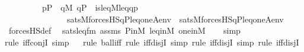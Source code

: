 \begin{isabellebody}
\ \ \ \ \ \ \ \ \ {\isacharparenleft}{\kern0pt}p{\isasymin}P\ {\isasymand}\ {\isasymnot}{\isacharparenleft}{\kern0pt}{\isasymexists}q{\isasymin}M{\isachardot}{\kern0pt}\ q{\isasymin}P\ {\isasymand}\ is{\isacharunderscore}{\kern0pt}leq{\isacharparenleft}{\kern0pt}{\isacharhash}{\kern0pt}{\isacharhash}{\kern0pt}M{\isacharcomma}{\kern0pt}leq{\isacharcomma}{\kern0pt}q{\isacharcomma}{\kern0pt}p{\isacharparenright}{\kern0pt}\ {\isasymand}\isanewline
\ \ \ \ \ \ \ \ \ \ \ \ \ \ \ {\isacharparenleft}{\kern0pt}sats{\isacharparenleft}{\kern0pt}M{\isacharcomma}{\kern0pt}forcesHS{\isacharprime}{\kern0pt}{\isacharparenleft}{\kern0pt}{\isasymphi}{\isacharparenright}{\kern0pt}{\isacharcomma}{\kern0pt}{\isacharbrackleft}{\kern0pt}q{\isacharcomma}{\kern0pt}P{\isacharcomma}{\kern0pt}leq{\isacharcomma}{\kern0pt}one{\isacharcomma}{\kern0pt}A{\isacharbrackright}{\kern0pt}{\isacharat}{\kern0pt}env{\isacharparenright}{\kern0pt}\ {\isasymand}\ sats{\isacharparenleft}{\kern0pt}M{\isacharcomma}{\kern0pt}forcesHS{\isacharprime}{\kern0pt}{\isacharparenleft}{\kern0pt}{\isasympsi}{\isacharparenright}{\kern0pt}{\isacharcomma}{\kern0pt}{\isacharbrackleft}{\kern0pt}q{\isacharcomma}{\kern0pt}P{\isacharcomma}{\kern0pt}leq{\isacharcomma}{\kern0pt}one{\isacharcomma}{\kern0pt}A{\isacharbrackright}{\kern0pt}{\isacharat}{\kern0pt}env{\isacharparenright}{\kern0pt}{\isacharparenright}{\kern0pt}{\isacharparenright}{\kern0pt}{\isacharparenright}{\kern0pt}{\isachardoublequoteclose}\isanewline
%
\isadelimproof
\ \ %
\endisadelimproof
%
\isatagproof
{}\isamarkupfalse%
\ forcesHS{\isacharunderscore}{\kern0pt}def\ \isamarkupfalse%
\ sats{\isacharunderscore}{\kern0pt}leq{\isacharunderscore}{\kern0pt}fm\ assms\ P{\isacharunderscore}{\kern0pt}in{\isacharunderscore}{\kern0pt}M\ leq{\isacharunderscore}{\kern0pt}in{\isacharunderscore}{\kern0pt}M\ one{\isacharunderscore}{\kern0pt}in{\isacharunderscore}{\kern0pt}M\isanewline
\ \ \isamarkupfalse%
\ simp\ \isanewline
\ \ \isamarkupfalse%
{\isacharparenleft}{\kern0pt}rule\ iff{\isacharunderscore}{\kern0pt}conjI{}{\isacharcomma}{\kern0pt}\ simp{\isacharparenright}{\kern0pt}\isanewline
\ \ \isamarkupfalse%
{\isacharparenleft}{\kern0pt}rule\ ball{\isacharunderscore}{\kern0pt}iff{\isacharcomma}{\kern0pt}\ rule\ iff{\isacharunderscore}{\kern0pt}disjI{\isacharcomma}{\kern0pt}\ simp{\isacharcomma}{\kern0pt}\ rule\ iff{\isacharunderscore}{\kern0pt}disjI{\isacharcomma}{\kern0pt}\ simp{\isacharcomma}{\kern0pt}\ rule\ iff{\isacharunderscore}{\kern0pt}disjI{\isacharparenright}{\kern0pt}\isanewline

\end{isabellebody}
